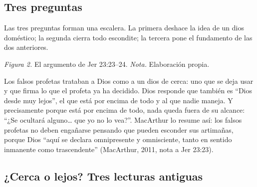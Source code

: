 \subsection{Tres preguntas}

Las tres preguntas forman una escalera. La primera deshace la idea de un dios doméstico; la segunda cierra todo escondite; la tercera pone el fundamento de las dos anteriores.

\begin{center}
\par
{\footnotesize\color{gris}\textit{Figura 2.} El argumento de Jer 23:23--24. \textit{Nota.} Elaboración propia.}
\end{center}

Los falsos profetas trataban a Dios como a un dios de cerca: uno que se deja usar y que firma lo que el profeta ya ha decidido. Dios responde que también es ``Dios desde muy lejos'', el que está por encima de todo y al que nadie maneja. Y precisamente porque está por encima de todo, nada queda fuera de su alcance: ``¿Se ocultará alguno\ldots{} que yo no lo vea?''. MacArthur lo resume así: los falsos profetas no deben engañarse pensando que pueden esconder sus artimañas, porque Dios ``aquí se declara omnipresente y omnisciente, tanto en sentido inmanente como trascendente'' (MacArthur, 2011, nota a Jer 23:23).

\subsection{¿Cerca o lejos? Tres lecturas antiguas}

